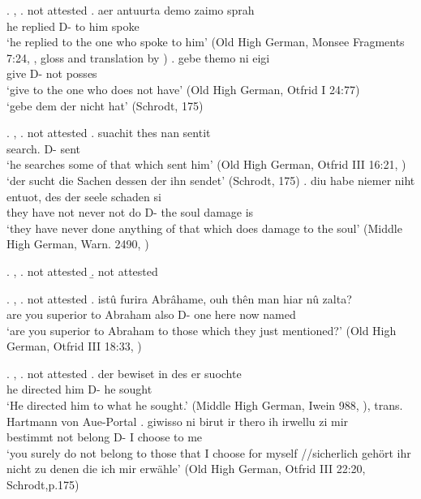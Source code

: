\ex. , 
\a.  not attested
\bg. aer antuurta demo zaimo sprah\\
he replied\scsub{[dat]} D- {to him} spoke\scsub{[nom]}\\
`he replied to the one who spoke to him' \hfill (Old High German, Monsee Fragments 7:24, \citealt[761]{behaghel1923}, gloss and translation by \citealt[199]{pittner1995})
\bg. gebe themo ni eigi\\
 give\scsub{[dat]} D- not posses\scsub{[nom]}\\
 `give to the one who does not have' \hfill (Old High German, Otfrid I 24:77)\\
 `gebe dem der nicht hat' \hfill (Schrodt, 175)

\ex. , 
\a.  not attested
\bg. suachit thes nan sentit\\
 search.\scsub{[gen?]} D-  sent\scsub{[nom]}\\
 `he searches some of that which sent him' \hfill (Old High German, Otfrid III 16:21, \citealt[761]{behaghel1923})
 `der sucht die Sachen dessen der ihn sendet' \hfill (Schrodt, 175)
\bg. diu habe niemer niht entuot\scsub{[gen?]}, des der seele schaden si\scsub{[nom]}\\
 they have not never {not do} D- the soul damage is\scsub{[nom]}\\
 `they have never done anything of that which does damage to the soul' \hfill (Middle High German, Warn. 2490, \citealt[761]{behaghel1923})

\ex. , 
\a.  not attested
\b.  not attested

\ex. , 
\a.  not attested
\bg. istû furira Abrâhame, ouh thên man hiar nû zalta?\\
 {are you} superior\scsub{[dat]} {to Abraham} also D- one here now named\scsub{[acc]}\\
 `are you superior to Abraham to those which they just mentioned?' \hfill (Old High German, Otfrid III 18:33, \citealt[761]{behaghel1923})

\ex. , 
\a.  not attested
\bg. der bewiset in des er suochte\\
 he directed\scsub{[gen]} him D- he sought\scsub{[acc]}\\
 `He directed him to what he sought.' \hfill (Middle High German, Iwein 988, \citealt[761]{behaghel1923}), trans. Hartmann von Aue-Portal
\bg. giwisso ni birut ir thero ih irwellu zi mir\\
 bestimmt not belong\scsub{[gen]}  D- I choose\scsub{[acc]} to me\\
 `you surely do not belong to those that I choose for myself //sicherlich gehört ihr nicht zu denen die ich mir erwähle' \hfill (Old High German, Otfrid III 22:20, Schrodt,p.175)

